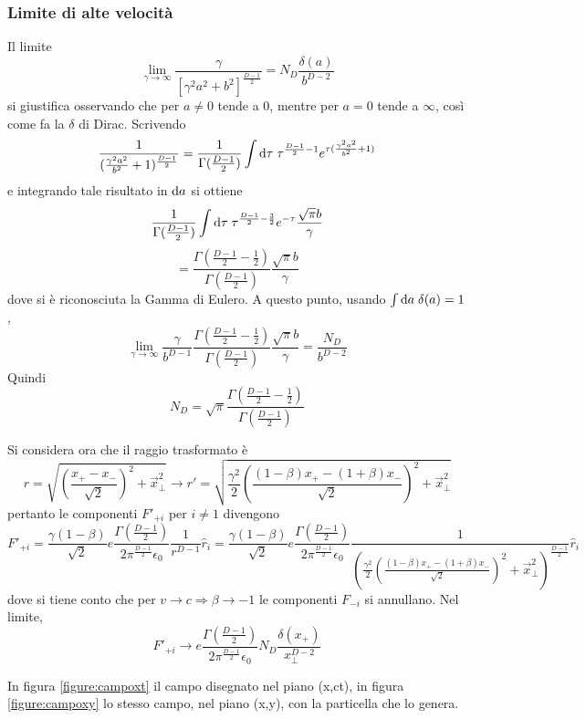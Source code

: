 \subsubsection{Limite di alte velocit\`a}
Il limite
\begin{equation} \label{eq:limND}
	\lim_{\gamma\rightarrow\infty} \frac{\gamma}{[\gamma^2a^2+b^2]^{\frac{D-1}{2}}} = N_D \frac{\delta(a)}{b^{D-2}} 
\end{equation}
si giustifica osservando che per \( a\neq0\) tende a 0, mentre per \( a=0\) tende a $\infty$, cos\`i come fa la $\delta$ di Dirac.
Scrivendo
\[ \frac{1}{(\frac{\gamma^2a^2}{b^2} +1)^{\frac{D-1}{2}}} = \frac{1}{\Gamma({\frac{D-1}{2}})} 
		\int \mathrm{d} \tau \;\tau^{\frac{D-1}{2}-1}e^{\tau(\frac{\gamma^2a^2}{b^2}+1)} \]
e integrando tale risultato in $\mathrm{d} a$ si ottiene
\[ \frac{1}{\Gamma({\frac{D-1}{2}})} 
		\int \mathrm{d} \tau \;\tau^{\frac{D-1}{2}-\frac{3}{2}} e^{-\tau} \frac{\sqrt{\pi}b}{\gamma} \]
\[ = \frac{\Gamma({\frac{D-1}{2}}-\frac{1}{2})}{\Gamma({\frac{D-1}{2}})} \frac{\sqrt{\pi}b}{\gamma} \]
dove si \`e riconosciuta la Gamma di Eulero.
A questo punto, usando \( \int \mathrm{d} a \; \delta(a) = 1 \),
\[ \lim_{\gamma\rightarrow\infty} \frac{\gamma}{b^{D-1}} \frac{\Gamma({\frac{D-1}{2}}-\frac{1}{2})}{\Gamma({\frac{D-1}{2}})} \frac{\sqrt{\pi}b}{\gamma} = \frac{N_D}{b^{D-2}} \]
Quindi
\[ N_D = \sqrt{\pi} \frac{\Gamma({\frac{D-1}{2}}-\frac{1}{2})}{\Gamma({\frac{D-1}{2}})} \]

Si considera ora che il raggio trasformato \`e
\[ r = \sqrt{ (\frac{x_+ - x_-}{\sqrt{2}})^2 + \vec{x}_\perp^2 } \rightarrow 
	r' = \sqrt{ \frac{\gamma^2}{2} (\frac{(1-\beta)x_+ - (1+\beta)x_-}{\sqrt{2}})^2 + \vec{x}_\perp^2 } \]
pertanto le componenti $F'_{+i}$  per \( i\neq1 \) divengono
\[ F'_{+i} = \frac{\gamma(1-\beta)}{\sqrt{2}}  e\frac{\Gamma(\frac{D-1}{2})}{2\pi^{\frac{D-1}{2}}\epsilon_0} \frac{1}{r^{D-1}} \hat{r}_i 
	= \frac{\gamma(1-\beta)}{\sqrt{2}}  e\frac{\Gamma(\frac{D-1}{2})}{2\pi^{\frac{D-1}{2}}\epsilon_0} 
	\frac{1}
	  {(\frac{\gamma^2}{2} 	(\frac{(1-\beta)x_+ - (1+\beta)x_-}{\sqrt{2}})^2 + \vec{x}_\perp^2)^{\frac{D-1}{2}}} \hat{r}_i \]
dove si tiene conto che per \(v\rightarrow c \Rightarrow \beta \rightarrow -1\) le componenti $F_{-i}$ si annullano.
Nel limite, 
\[ F'_{+i} \rightarrow  e\frac{\Gamma(\frac{D-1}{2})}{2\pi^{\frac{D-1}{2}}\epsilon_0}
	N_D \frac{\delta(x_+)}{x_\perp^{D-2}} \]

In figura \ref{figure:campoxt} il campo disegnato nel piano (x,ct), in figura \ref{figure:campoxy} lo stesso campo, nel piano (x,y), con la particella che lo genera.



